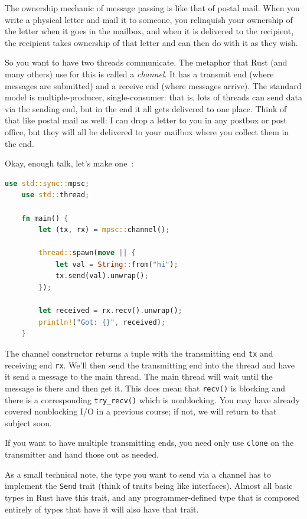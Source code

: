 The ownership mechanic of message passing is like that of postal mail. When you write a physical letter and mail it to someone, you relinquish your ownership of the letter when it goes in the mailbox, and when it is delivered to the recipient, the recipient takes ownership of that letter and can then do with it as they wish.

So you want to have two threads communicate. The metaphor that Rust (and many others) use for this is called a \textit{channel}. It has a transmit end (where messages are submitted) and a receive end (where messages arrive). The standard model is multiple-producer, single-consumer: that is, lots of threads can send data via the sending end, but in the end it all gets delivered to one place. Think of that like postal mail as well: I can drop a letter to you in any postbox or post office, but they will all be delivered to your mailbox where you collect them in the end.

Okay, enough talk, let's make one~\cite{rustdocs}:
\begin{lstlisting}[language=Rust]
    use std::sync::mpsc;
    use std::thread;

    fn main() {
        let (tx, rx) = mpsc::channel();

        thread::spawn(move || {
            let val = String::from("hi");
            tx.send(val).unwrap();
        });

        let received = rx.recv().unwrap();
        println!("Got: {}", received);
    }
\end{lstlisting}

The channel constructor returns a tuple with the transmitting end \texttt{tx} and receiving end \texttt{rx}. We'll then send the transmitting end into the thread and have it send a message to the main thread. The main thread will wait until the message is there and then get it. This does mean that \texttt{recv()} is blocking and there is a corresponding \texttt{try\_recv()} which is nonblocking. You may have already covered nonblocking I/O in a previous course; if not, we will return to that subject soon.

If you want to have multiple transmitting ends, you need only use \texttt{clone} on the transmitter and hand those out as needed. 

As a small technical note, the type you want to send via a channel has to implement the \texttt{Send} trait (think of traits being like interfaces). Almost all basic types in Rust have this trait, and any programmer-defined type that is composed entirely of types that have it will also have that trait.  



